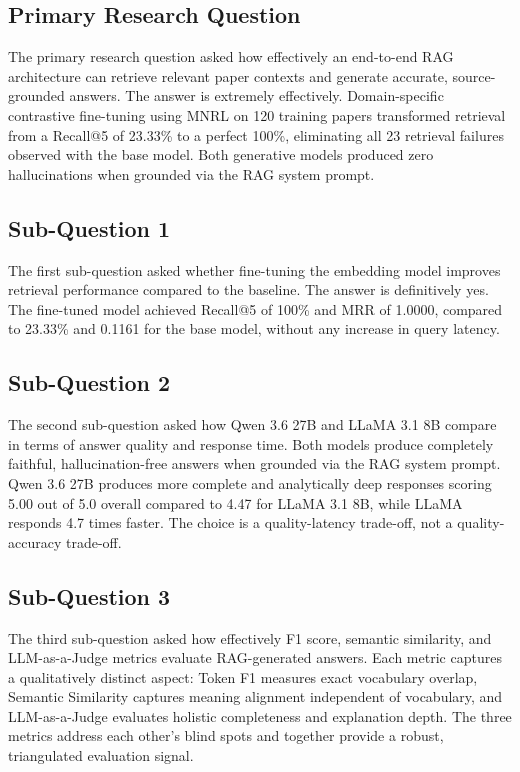\subsection{Primary Research Question}

The primary research question asked how effectively an end-to-end RAG architecture can retrieve relevant paper contexts and generate accurate, source-grounded answers. The answer is extremely effectively. Domain-specific contrastive fine-tuning using MNRL on 120 training papers transformed retrieval from a Recall@5 of 23.33\% to a perfect 100\%, eliminating all 23 retrieval failures observed with the base model. Both generative models produced zero hallucinations when grounded via the RAG system prompt.

\subsection{Sub-Question 1}

The first sub-question asked whether fine-tuning the embedding model improves retrieval performance compared to the baseline. The answer is definitively yes. The fine-tuned model achieved Recall@5 of 100\% and MRR of 1.0000, compared to 23.33\% and 0.1161 for the base model, without any increase in query latency.

\subsection{Sub-Question 2}

The second sub-question asked how Qwen 3.6 27B and LLaMA 3.1 8B compare in terms of answer quality and response time. Both models produce completely faithful, hallucination-free answers when grounded via the RAG system prompt. Qwen 3.6 27B produces more complete and analytically deep responses scoring 5.00 out of 5.0 overall compared to 4.47 for LLaMA 3.1 8B, while LLaMA responds 4.7 times faster. The choice is a quality-latency trade-off, not a quality-accuracy trade-off.

\subsection{Sub-Question 3}

The third sub-question asked how effectively F1 score, semantic similarity, and LLM-as-a-Judge metrics evaluate RAG-generated answers. Each metric captures a qualitatively distinct aspect: Token F1 measures exact vocabulary overlap, Semantic Similarity captures meaning alignment independent of vocabulary, and LLM-as-a-Judge evaluates holistic completeness and explanation depth. The three metrics address each other's blind spots and together provide a robust, triangulated evaluation signal.

